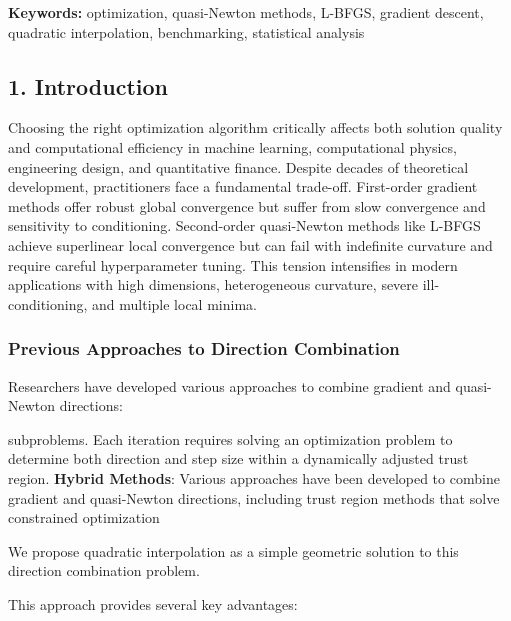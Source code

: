 \textbf{Keywords:} optimization, quasi-Newton methods, L-BFGS, gradient descent, quadratic interpolation, benchmarking,
statistical analysis

\hypertarget{introduction}{%
\subsection{1. Introduction}\label{introduction}}

Choosing the right optimization algorithm critically affects both solution quality and computational efficiency in
machine learning, computational physics, engineering design, and quantitative finance. Despite decades of theoretical
development, practitioners face a fundamental trade-off. First-order gradient methods offer robust global convergence
but suffer from slow convergence and sensitivity to conditioning. Second-order quasi-Newton methods like L-BFGS achieve
superlinear local convergence but can fail with indefinite curvature and require careful hyperparameter tuning. This
tension intensifies in modern applications with high dimensions, heterogeneous curvature, severe ill-conditioning, and
multiple local minima.

\hypertarget{previous-approaches-to-direction-combination}{%
\subsubsection{Previous Approaches to Direction Combination}\label{previous-approaches-to-direction-combination}}

Researchers have developed various approaches to combine gradient and quasi-Newton directions:

subproblems. Each iteration requires solving an optimization problem to determine both direction and step size within
a dynamically adjusted trust region.
\textbf{Hybrid Methods}: Various approaches have been developed to combine gradient and quasi-Newton directions, including trust region methods that solve constrained optimization


We propose quadratic interpolation as a simple geometric solution to this direction combination problem.

This approach provides several key advantages:

